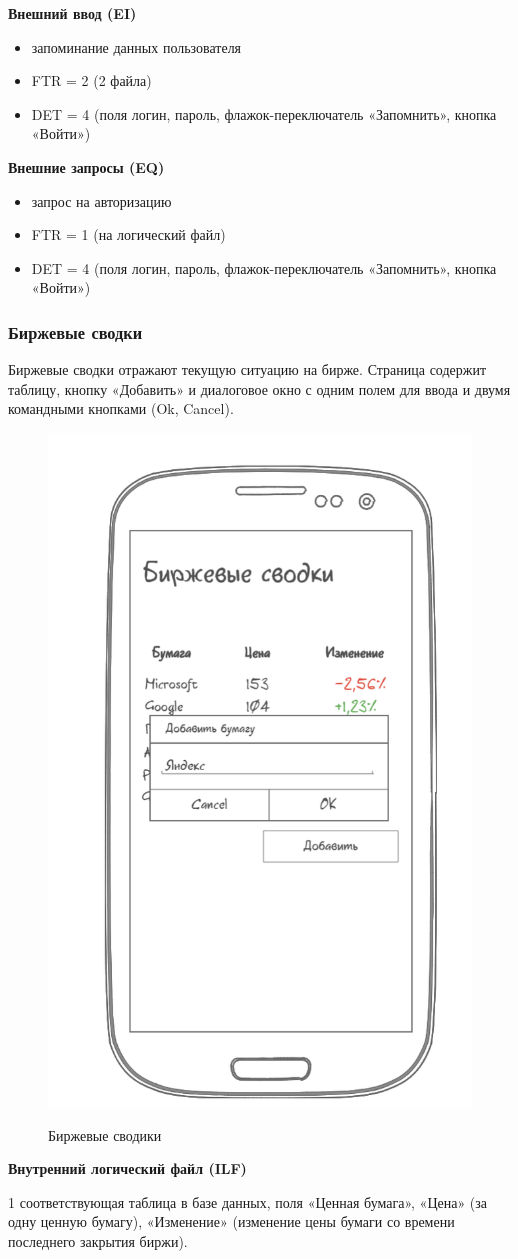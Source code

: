 \textbf{Внешний ввод (EI)}

\begin{itemize}
	\item запоминание данных пользователя
	\item FTR = 2 (2 файла)
	\item DET = 4 (поля логин, пароль, флажок-переключатель «Запомнить», кнопка «Войти»)

\end{itemize}

\textbf{Внешние запросы (EQ)}

\begin{itemize}
	\item запрос на авторизацию
	\item FTR = 1 (на логический файл)
	\item DET = 4 (поля логин, пароль, флажок-переключатель «Запомнить», кнопка «Войти»)
\end{itemize}


\subsubsection{Биржевые сводки}

Биржевые сводки отражают текущую ситуацию на бирже. Страница содержит таблицу, кнопку «Добавить» и диалоговое окно с одним полем для ввода и двумя командными кнопками (Ok, Cancel).


\begin{figure}[ht!]
	\includegraphics[width=0.3\linewidth]{assets/images/1.2 Биржевые сводики.png}
	\label{fig:r2}
	\caption{Биржевые сводики}
\end{figure}
\FloatBarrier

\textbf{Внутренний логический файл (ILF)}

1 соответствующая таблица в базе данных, поля «Ценная бумага», «Цена» (за одну ценную бумагу), «Изменение» (изменение цены бумаги со времени последнего закрытия биржи).

